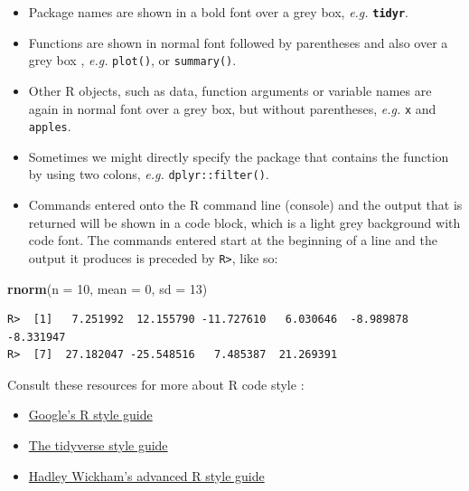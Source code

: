 \documentclass[]{book}
\newenvironment{Shaded}{\begin{snugshade}}{\end{snugshade}}
\newcommand{\KeywordTok}[1]{\textcolor[rgb]{0.13,0.29,0.53}{\textbf{#1}}}
\newcommand{\DataTypeTok}[1]{\textcolor[rgb]{0.13,0.29,0.53}{#1}}
\newcommand{\DecValTok}[1]{\textcolor[rgb]{0.00,0.00,0.81}{#1}}
\newcommand{\NormalTok}[1]{#1}
\providecommand{\tightlist}{%
  \setlength{\itemsep}{0pt}\setlength{\parskip}{0pt}}
\theoremstyle{definition}
\theoremstyle{definition}
\theoremstyle{definition}
\theoremstyle{remark}
\begin{document}
\begin{itemize}
\tightlist
\item
  Package names are shown in a bold font over a grey box, \emph{e.g.}
  \textbf{\texttt{tidyr}}.
\item
  Functions are shown in normal font followed by parentheses and also
  over a grey box , \emph{e.g.} \texttt{plot()}, or \texttt{summary()}.
\item
  Other R objects, such as data, function arguments or variable names
  are again in normal font over a grey box, but without parentheses,
  \emph{e.g.} \texttt{x} and \texttt{apples}.
\item
  Sometimes we might directly specify the package that contains the
  function by using two colons, \emph{e.g.} \texttt{dplyr::filter()}.
\item
  Commands entered onto the R command line (console) and the output that
  is returned will be shown in a code block, which is a light grey
  background with code font. The commands entered start at the beginning
  of a line and the output it produces is preceded by
  \texttt{R\textgreater{}}, like so:
\end{itemize}

\begin{Shaded}
\begin{Highlighting}[]
\KeywordTok{rnorm}\NormalTok{(}\DataTypeTok{n =} \DecValTok{10}\NormalTok{, }\DataTypeTok{mean =} \DecValTok{0}\NormalTok{, }\DataTypeTok{sd =} \DecValTok{13}\NormalTok{)}
\end{Highlighting}
\end{Shaded}

\begin{verbatim}
R>  [1]   7.251992  12.155790 -11.727610   6.030646  -8.989878  -8.331947
R>  [7]  27.182047 -25.548516   7.485387  21.269391
\end{verbatim}

Consult these resources for more about R code style :

\begin{itemize}
\tightlist
\item
  \href{https://google.github.io/styleguide/Rguide.xml}{Google's R style
  guide}
\item
  \href{http://style.tidyverse.org}{The tidyverse style guide}
\item
  \href{http://adv-r.had.co.nz/Style.html}{Hadley Wickham's advanced R
  style guide}
\end{itemize}
\end{document}
